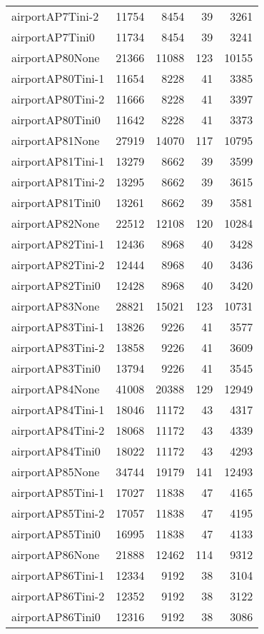 \begin{longtable}{lrrrr}
airportAP7Tini-2 & 11754 & 8454 & 39 & 3261 \\
airportAP7Tini0 & 11734 & 8454 & 39 & 3241 \\
airportAP80None & 21366 & 11088 & 123 & 10155 \\
airportAP80Tini-1 & 11654 & 8228 & 41 & 3385 \\
airportAP80Tini-2 & 11666 & 8228 & 41 & 3397 \\
airportAP80Tini0 & 11642 & 8228 & 41 & 3373 \\
airportAP81None & 27919 & 14070 & 117 & 10795 \\
airportAP81Tini-1 & 13279 & 8662 & 39 & 3599 \\
airportAP81Tini-2 & 13295 & 8662 & 39 & 3615 \\
airportAP81Tini0 & 13261 & 8662 & 39 & 3581 \\
airportAP82None & 22512 & 12108 & 120 & 10284 \\
airportAP82Tini-1 & 12436 & 8968 & 40 & 3428 \\
airportAP82Tini-2 & 12444 & 8968 & 40 & 3436 \\
airportAP82Tini0 & 12428 & 8968 & 40 & 3420 \\
airportAP83None & 28821 & 15021 & 123 & 10731 \\
airportAP83Tini-1 & 13826 & 9226 & 41 & 3577 \\
airportAP83Tini-2 & 13858 & 9226 & 41 & 3609 \\
airportAP83Tini0 & 13794 & 9226 & 41 & 3545 \\
airportAP84None & 41008 & 20388 & 129 & 12949 \\
airportAP84Tini-1 & 18046 & 11172 & 43 & 4317 \\
airportAP84Tini-2 & 18068 & 11172 & 43 & 4339 \\
airportAP84Tini0 & 18022 & 11172 & 43 & 4293 \\
airportAP85None & 34744 & 19179 & 141 & 12493 \\
airportAP85Tini-1 & 17027 & 11838 & 47 & 4165 \\
airportAP85Tini-2 & 17057 & 11838 & 47 & 4195 \\
airportAP85Tini0 & 16995 & 11838 & 47 & 4133 \\
airportAP86None & 21888 & 12462 & 114 & 9312 \\
airportAP86Tini-1 & 12334 & 9192 & 38 & 3104 \\
airportAP86Tini-2 & 12352 & 9192 & 38 & 3122 \\
airportAP86Tini0 & 12316 & 9192 & 38 & 3086 \\

\end{longtable}
